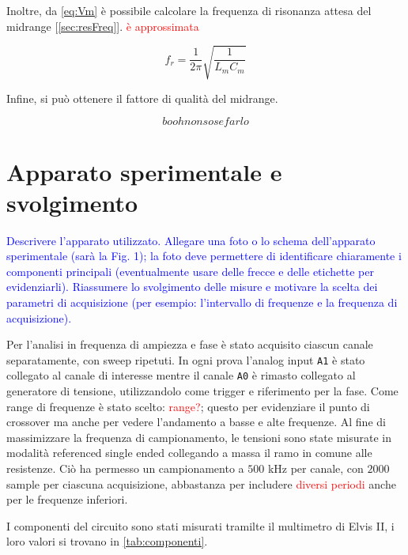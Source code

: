 \documentclass[12pt,italian]{article}
\newcommand{\prof}[1]{\textcolor{blue}{#1}}
\newcommand{\err}[1]{\textcolor{red}{#1}}
\begin{document}
\noindent
Inoltre, da \eqref{eq:Vm} è possibile calcolare la frequenza di risonanza attesa del midrange [\ref{sec:resFreq}].
\err{è approssimata}

\begin{equation}
  f_{r} = \frac{1}{2\pi}\sqrt{\frac{1}{L_{m} C_{m}}}  %
  \label{eq:fr}
\end{equation}

\noindent
Infine, si può ottenere il fattore di qualità del midrange.

\begin{equation}
  booh non so se farlo
\end{equation}

\section*{Apparato sperimentale e svolgimento}
\prof{ Descrivere l'apparato utilizzato. Allegare una foto o lo schema
  dell'apparato sperimentale (sarà la Fig. 1); la foto deve permettere di
  identificare chiaramente i componenti principali (eventualmente usare delle
  frecce e delle etichette per evidenziarli). Riassumere lo svolgimento delle
  misure e motivare la scelta dei parametri di acquisizione (per esempio:
  l'intervallo di frequenze e la frequenza di acquisizione). }

Per l'analisi in frequenza di ampiezza e fase è stato acquisito ciascun canale
separatamente, con sweep ripetuti. In ogni prova l'analog input \texttt{A1} è
stato collegato al canale di interesse mentre il canale \texttt{A0} è rimasto
collegato al generatore di tensione, utilizzandolo come trigger e riferimento
per la fase. Come range di frequenze è stato scelto: \err{range?}; questo per
evidenziare il punto di crossover ma anche per vedere l'andamento a basse e
alte frequenze. Al fine di massimizzare la frequenza di campionamento, le
tensioni sono state misurate in modalità referenced single ended collegando a
massa il ramo in comune alle resistenze. Ciò ha permesso un campionamento a
$500$ kHz per canale, con $2000$ sample per ciascuna acquisizione, abbastanza
per includere \err{diversi periodi} anche per le frequenze inferiori.

I componenti del circuito sono stati misurati tramilte il multimetro di Elvis
II, i loro valori si trovano in \cref{tab:componenti}.
\end{document}
